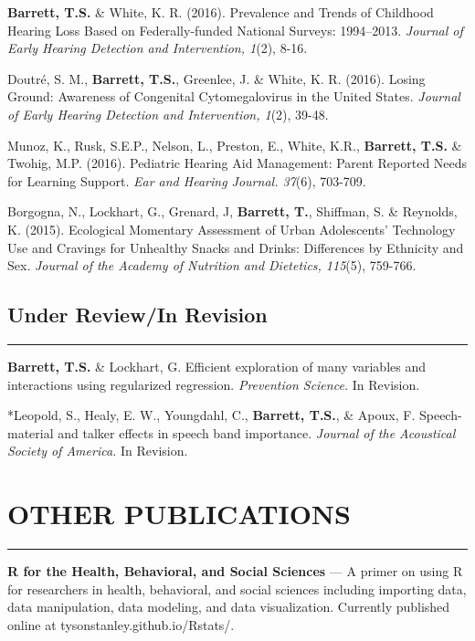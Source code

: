 \documentclass[]{DissertateUSU}
\begin{document}
\textbf{Barrett, T.S.} \& White, K. R. (2016). Prevalence and Trends of
Childhood Hearing Loss Based on Federally-funded National Surveys:
1994--2013.
\emph{Journal of Early Hearing Detection and Intervention, 1}(2), 8-16.

Doutré, S. M., \textbf{Barrett, T.S.}, Greenlee, J. \& White, K. R.
(2016). Losing Ground: Awareness of Congenital Cytomegalovirus in the
United States.
\emph{Journal of Early Hearing Detection and Intervention, 1}(2), 39-48.

Munoz, K., Rusk, S.E.P., Nelson, L., Preston, E., White, K.R.,
\textbf{Barrett, T.S.} \& Twohig, M.P. (2016). Pediatric Hearing Aid
Management: Parent Reported Needs for Learning Support.
\emph{Ear and Hearing Journal. 37}(6), 703-709.

Borgogna, N., Lockhart, G., Grenard, J, \textbf{Barrett, T.}, Shiffman,
S. \& Reynolds, K. (2015). Ecological Momentary Assessment of Urban
Adolescents' Technology Use and Cravings for Unhealthy Snacks and
Drinks: Differences by Ethnicity and Sex.
\emph{Journal of the Academy of Nutrition and Dietetics, 115}(5),
759-766.

\vspace{10pt} \tocless\subsection{Under Review/In Revision}
\vspace{-10pt} \hrule

\textbf{Barrett, T.S.} \& Lockhart, G. Efficient exploration of many
variables and interactions using regularized regression.
\emph{Prevention Science.} In Revision.

*Leopold, S., Healy, E. W., Youngdahl, C., \textbf{Barrett, T.S.}, \&
Apoux, F. Speech-material and talker effects in speech band importance.
\emph{Journal of the Acoustical Society of America.} In Revision.

\vspace{20pt} \tocless\section{OTHER PUBLICATIONS} \vspace{-10pt} \hrule

\textbf{R for the Health, Behavioral, and Social Sciences} --- A primer
on using R for researchers in health, behavioral, and social sciences
including importing data, data manipulation, data modeling, and data
visualization. Currently published online at
tysonstanley.github.io/Rstats/.
\end{document}
